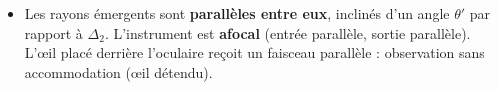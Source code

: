 \documentclass[11pt]{article}
\begin{document}
\begin{methode}
\begin{enumerate}
\begin{itemize}
                \begin{itemize}
                    \item Rayon passant par $O_{oc}$ : non dévié.
                    \item Rayon parallèle à $\Delta_2$ (ou tout autre rayon) : réfracté selon les règles de la lentille mince (passe par $F'_{oc}$ si incident // $\Delta_2$).
                \end{itemize}
            \item Les rayons émergents sont \textbf{parallèles entre eux}, inclinés d'un angle $\theta'$ par rapport à $\Delta_2$. L'instrument est \textbf{afocal} (entrée parallèle, sortie parallèle). L'œil placé derrière l'oculaire reçoit un faisceau parallèle : observation sans accommodation (œil détendu).
        \end{itemize}
\end{enumerate}
\end{methode}
\end{document}
